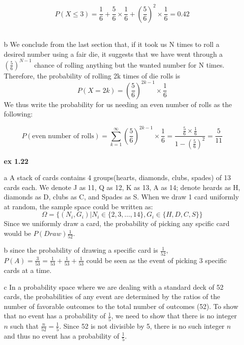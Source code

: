\documentclass{article}
\begin{document}
\begin{itemize}
            $$P(X\leq 3) = \frac{1}{6}+\frac{5}{6}\times\frac{1}{6}+(\frac{5}{6})^2\times\frac{1}{6}=0.42$$\\

      \item[b] We conclude from the last section that, if it took us N times to roll a desired number using a fair die, it suggests that we have went through a $(\frac{5}{6})^{N-1}$ chance of rolling anything but the wanted number for N times.\\
            Therefore, the probability of rolling 2k times of die rolls is $$P(X=2k)=(\frac{5}{6})^{2k-1}\times \frac{1}{6}$$
            We thus write the probability for us needing an even number of rolls as the following:

            \begin{equation}
                  P(\text{even number of rolls})= \sum_{k=1}^{\infty}(\frac{5}{6})^{2k-1}\times \frac{1}{6} = \frac{\frac{5}{6}\times \frac{1}{6}}{1-(\frac{5}{6})^2}=\frac{5}{11}
            \end{equation}

      \item[\textbf{ex 1.22}]
      \item[a] A stack of cards contains 4 groups(hearts, diamonds, clubs, spades) of 13 cards each. We denote J as 11, Q as 12, K as 13, A as 14; denote heards as H, diamonds as D, clubs as C, and Spades as S. When we draw 1 card uniformly at random, the sample space could be written as:
            \begin{equation}
                  \Omega = \{(N_i,G_i)|N_i\in\{2,3,\dots,14\},G_i\in\{H,D,C,S\} \}
            \end{equation}
            Since we uniformly draw a card, the probability of picking any spcific card would be $P(Draw)\frac{1}{52}$.

      \item[b]since the probability of drawing a specific card is $\frac{1}{52}$, $P(A)=\frac{3}{53}=\frac{1}{53}+\frac{1}{53}+\frac{1}{53}$ could be seen as the event of picking 3 specific cards at a time.

      \item[c] In a probability space where we are dealing with a standard deck of 52 cards, the probabilities of any event are determined by the ratios of the number of favorable outcomes to the total number of outcomes (52).
            To show that no event has a probability of $\frac{1}{5}$, we need to show that there is no integer $n$ such that $\frac{n}{52}=\frac{1}{5}$.  Since 52 is not divisible by 5, there is no such integer $n$ and thus no event has a probability of $\frac{1}{5}$.


\end{itemize}
\end{document}
